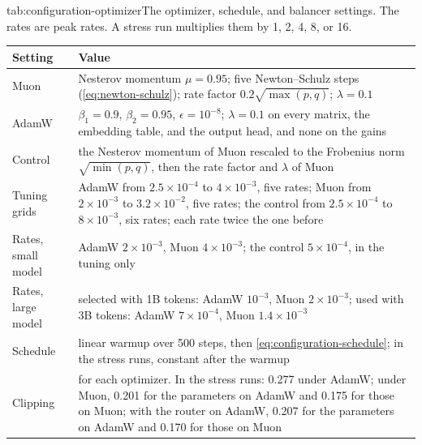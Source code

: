 \begin{table}[The optimizer, schedule, and balancer settings]{tab:configuration-optimizer}{The optimizer, schedule, and balancer settings. The rates are peak rates. A stress run multiplies them by 1, 2, 4, 8, or 16.}
  \begin{tabular}{l>{\raggedright\arraybackslash}p{11.6cm}}
    \toprule
    Setting            & Value                                                                                                                                                                                         \\
    \midrule
    Muon               & Nesterov momentum $\mu = 0.95$; five Newton--Schulz steps (\cref{eq:newton-schulz}); rate factor $0.2 \sqrt{\max(p, q)}$; $\lambda = 0.1$                                                       \\
    AdamW              & $\beta_1 = 0.9$, $\beta_2 = 0.95$, $\epsilon = 10^{-8}$; $\lambda = 0.1$ on every matrix, the embedding table, and the output head, and none on the gains                                      \\
    Control            & the Nesterov momentum of Muon rescaled to the Frobenius norm $\sqrt{\min(p, q)}$, then the rate factor and $\lambda$ of Muon                                                                    \\
    Tuning grids       & AdamW from $2.5 \times 10^{-4}$ to $4 \times 10^{-3}$, five rates; Muon from $2 \times 10^{-3}$ to $3.2 \times 10^{-2}$, five rates; the control from $2.5 \times 10^{-4}$ to $8 \times 10^{-3}$, six rates; each rate twice the one before \\
    Rates, small model & AdamW $2 \times 10^{-3}$, Muon $4 \times 10^{-3}$; the control $5 \times 10^{-4}$, in the tuning only                                                                                            \\
    Rates, large model & selected with 1B tokens: AdamW $10^{-3}$, Muon $2 \times 10^{-3}$; used with 3B tokens: AdamW $7 \times 10^{-4}$, Muon $1.4 \times 10^{-3}$                                                             \\
    Schedule           & linear warmup over 500 steps, then \cref{eq:configuration-schedule}; in the stress runs, constant after the warmup                                                                             \\
    Clipping           & 1.0 for each optimizer. In the stress runs: 0.277 under AdamW; under Muon, 0.201 for the parameters on AdamW and 0.175 for those on Muon; with the router on AdamW, 0.207 for the parameters on AdamW and 0.170 for those on Muon \\

\end{tabular}
\end{table}
